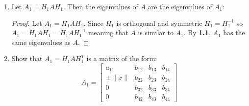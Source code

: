 \documentclass[12pt]{article}
\begin{document}
\begin{enumerate}[label=(\alph*)]
\begin{proof}
            $H_1 = H_1^T$ so $H_1$ is symmetric.\\
        \end{proof}
    \item Let $A_1 = H_1AH_1$. Then the eigenvalues of $A$ are the eigenvalues of $A_1$:
        \begin{proof}
            Let $A_1 = H_1AH_1$. Since $H_1$ is orthogonal and symmetric $H_1 = H_1^{-1}$ so $A_1 = H_1AH_1 = H_1AH_1^{-1}$ 
            meaning that $A$ is similar to $A_1$. By \textbf{1.1}, $A_1$ has the same eigenvalues as $A$.
        \end{proof} 
    \item Show that \( A_1 = H_1 A H_1^T \) is a matrix of the form:
        \[
            A_1 = \begin{bmatrix} 
            a_{11} & b_{12} & b_{13} & b_{14} \\
            \pm \|x\| & b_{22} & b_{23} & b_{24} \\
            0 & b_{32} & b_{33} & b_{34} \\
            0 & b_{42} & b_{43} & b_{44}
            \end{bmatrix}
        \]\\


\end{enumerate}
\end{document}
